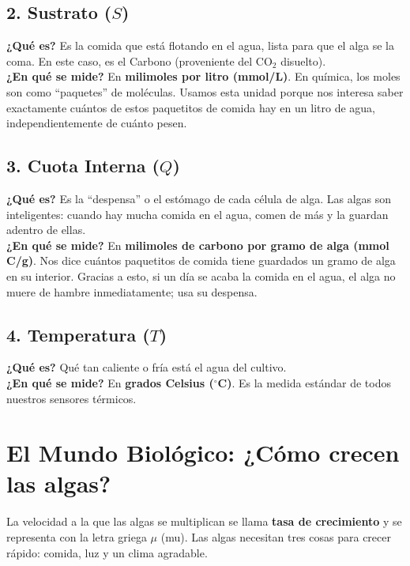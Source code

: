 \documentclass[11pt,a4paper]{article}
\begin{document}
\subsection{2. Sustrato ($S$)}
\textbf{¿Qué es?} Es la comida que está flotando en el agua, lista para que el alga se la coma. En este caso, es el Carbono (proveniente del CO$_2$ disuelto).\\
\textbf{¿En qué se mide?} En \textbf{milimoles por litro (mmol/L)}. En química, los moles son como ``paquetes'' de moléculas. Usamos esta unidad porque nos interesa saber exactamente cuántos de estos paquetitos de comida hay en un litro de agua, independientemente de cuánto pesen.

\subsection{3. Cuota Interna ($Q$)}
\textbf{¿Qué es?} Es la ``despensa'' o el estómago de cada célula de alga. Las algas son inteligentes: cuando hay mucha comida en el agua, comen de más y la guardan adentro de ellas.\\
\textbf{¿En qué se mide?} En \textbf{milimoles de carbono por gramo de alga (mmol C/g)}. Nos dice cuántos paquetitos de comida tiene guardados un gramo de alga en su interior. Gracias a esto, si un día se acaba la comida en el agua, el alga no muere de hambre inmediatamente; usa su despensa.

\subsection{4. Temperatura ($T$)}
\textbf{¿Qué es?} Qué tan caliente o fría está el agua del cultivo.\\
\textbf{¿En qué se mide?} En \textbf{grados Celsius ($^\circ$C)}. Es la medida estándar de todos nuestros sensores térmicos.

\section{El Mundo Biológico: ¿Cómo crecen las algas?}
La velocidad a la que las algas se multiplican se llama \textbf{tasa de crecimiento} y se representa con la letra griega $\mu$ (mu). Las algas necesitan tres cosas para crecer rápido: comida, luz y un clima agradable.
\end{document}
